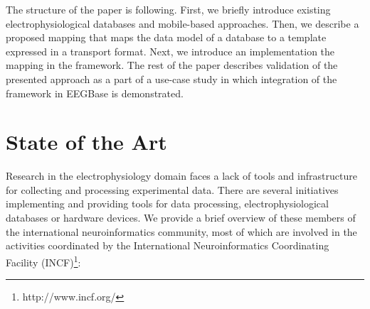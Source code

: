 \documentclass[conference]{IEEEtran}
\begin{document}
The structure of the paper is following. First, we briefly introduce existing electrophysiological databases and mobile-based approaches. Then, we describe a proposed mapping that maps the data model of a database to a template expressed in a transport format. Next, we introduce an implementation the mapping in the framework. The rest of the paper describes validation of the presented approach as a part of a use-case study in which integration of the framework in EEGBase \cite{ISI:000306821100004} is demonstrated.

\section{State of the Art}

Research in the electrophysiology domain faces a lack of tools and infrastructure for collecting and processing experimental data. There are several initiatives implementing and providing tools for data processing, electrophysiological databases or hardware devices. We provide a brief overview of these members of the international neuroinformatics community, most of which are involved in the activities coordinated by the International Neuroinformatics Coordinating Facility (INCF)\footnote{http://www.incf.org/}:
\end{document}
